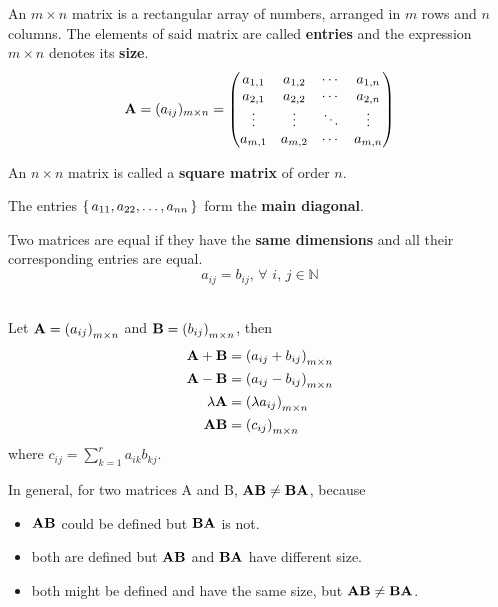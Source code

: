 
\begin{definition}
  An $m \times n$ matrix is a rectangular array of numbers, arranged in $m$ rows and $n$ columns. The elements of said matrix are called \textbf{entries} and the expression $m \times n$ denotes its \textbf{size}.
\[\mathbf{A} =  (a_{ij})_{m \times n}  = 
 \begin{pmatrix}
   a_{1,1} & a_{1,2} & \cdots & a_{1,n} \\
   a_{2,1} & a_{2,2} & \cdots & a_{2,n} \\
   \vdots  & \vdots  & \ddots & \vdots  \\
   a_{m,1} & a_{m,2} & \cdots & a_{m,n} 
 \end{pmatrix} \]
\end{definition}

\begin{definition}
  An $ n\times n$ matrix is called a \textbf{square matrix} of order $n$.

  The entries $\set{a_{11}, a_{22}, \ldots, a_{nn}}$ form the \textbf{main diagonal}.
\end{definition}

 \begin{definition}
   Two matrices are equal if they have the \textbf{same dimensions} and all their corresponding entries are equal. 
   $$a_{ij} = b_{ij},\, \forall\,\, i,\,j\in\mathbb{N} $$
\end{definition}~\\
Let $\mathbf{A} = \left( a_{ij} \right)_{m \times n}$ and $\mathbf{B} = \left( b_{ij} \right)_{m \times n}$, then 
\begin{align*}
\mathbf{A} + \mathbf{B}  &= \left( a_{ij} + b_{ij} \right)_{m \times n}\\
\mathbf{A} - \mathbf{B} &= \left( a_{ij} - b_{ij} \right)_{m \times n}\\
\lambda\mathbf{A} &= \left( \lambda a_{ij} \right)_{m \times n}\\
\mathbf{AB} &= \left( c_{ij} \right)_{m \times n}\\
\end{align*}
where $c_{ij} = \sum_{k=1}^r a_{ik}b_{kj}$.
\begin{note}
  In general, for two matrices \matri A and \matri B, $\mathbf{AB} \neq \mathbf{BA}$, because
  \begin{itemize}
    \item $\mathbf{AB}$ could be defined but $\mathbf{BA}$ is not.
    \item both are defined but $\mathbf{AB}$ and $\mathbf{BA}$ have different size.
    \item both might be defined and have the same size, but $\mathbf{AB} \neq \mathbf{BA}$.
  \end{itemize}
\end{note}

